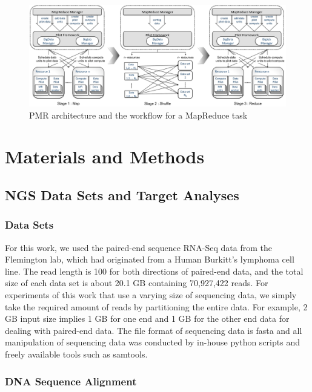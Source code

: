 \documentclass{sig-alternate}
\begin{document}
\begin{center}
\hfill{}
\begin{figure}
 \centering
\includegraphics[scale=0.35]{figures/F1_1.pdf} 
\hfill{}
\caption{\small PMR architecture and the workflow for a MapReduce task}
  \label{fig:arch-pj-saga-mr} 
\end{figure}
\end{center}


\section{Materials and Methods}\label{sec:materials_and_methods}
\subsection{NGS Data Sets and Target Analyses}
\subsubsection{Data Sets}

For this work, we used the paired-end sequence RNA-Seq data from the Flemington lab, which had originated from a Human Burkitt's lymphoma cell line\cite{erik_2010}.  The read length is 100 for both directions of paired-end data, and the total size of each data set is about 20.1 GB containing 70,927,422 reads.  For experiments of this work that use a varying size of sequencing data, we simply take the required amount of reads by partitioning the entire data.  For example, 2 GB input size implies 1 GB for one end and 1 GB for the other end data for dealing with paired-end data.  The file format of sequencing data is fasta and all manipulation of sequencing data was conducted by in-house python scripts and freely available tools such as samtools\cite{samtools}.  

\subsubsection{DNA Sequence Alignment}
\end{document}
